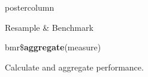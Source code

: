 \documentclass{beamer}
\begin{document}
\begin{frame}[fragile]{}
\begin{columns}
\begin{column}{.245\textwidth}
\begin{beamercolorbox}[center]{postercolumn}
\begin{minipage}{.98\textwidth}
{\begin{myblock}{Resample \& Benchmark}
					    \vspace{1cm}
					    \begin{codebox}
					    	bmr\$\textbf{aggregate}(measure)
					    \end{codebox}
					    Calculate and aggregate performance.
						\end{myblock}\vfill
					}
				\end{minipage}
			\end{beamercolorbox}
		\end{column}
	\end{columns}
\end{frame}
\end{document}
